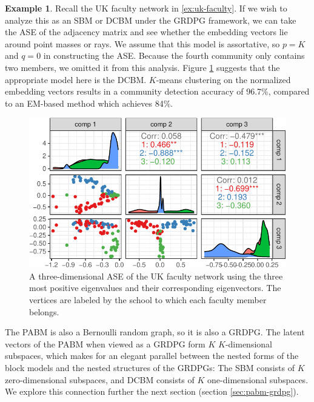 \documentclass[
  12pt,
]{article}
\theoremstyle{definition}
\theoremstyle{definition}
\newtheorem{example}{Example}[section]
\theoremstyle{definition}
\theoremstyle{definition}
\theoremstyle{remark}
\begin{document}
\begin{example}
Recall the UK faculty network in \ref{ex:uk-faculty}. 
If we wish to analyze this as an SBM or DCBM under the GRDPG framework, we can take the ASE of the adjacency matrix and see whether the embedding vectors lie around point masses or rays. 
We assume that this model is assortative, so $p = K$ and $q = 0$ in constructing the ASE. 
Because the fourth community only contains two members, we omitted it from this analysis. 
Figure \ref{fig:ukfaculty-ase} suggests that the appropriate model here is the DCBM. 
$K$-means clustering on the normalized embedding vectors results in a community detection accuracy of 96.7\%, compared to an EM-based method which achieves 84\%. 

\begin{figure}[H]

{\centering \includegraphics{draft_files/figure-latex/ukfaculty-ase-1} 

}

\caption{A three-dimensional ASE of the UK faculty network using the three most positive eigenvalues and their corresponding eigenvectors. The vertices are labeled by the school to which each faculty member belongs.}\label{fig:ukfaculty-ase}
\end{figure}

\end{example}

The PABM is also a Bernoulli random graph, so it is also a GRDPG.
The latent vectors of the PABM when viewed as a GRDPG form \(K\) \(K\)-dimensional subspaces, which makes for an elegant parallel between the nested forms of the block models and the nested structures of the GRDPGs: The SBM consists of \(K\) zero-dimensional subspaces, and DCBM consists of \(K\) one-dimensional subspaces.
We explore this connection further the next section (section \ref{sec:pabm-grdpg}).
\end{document}
